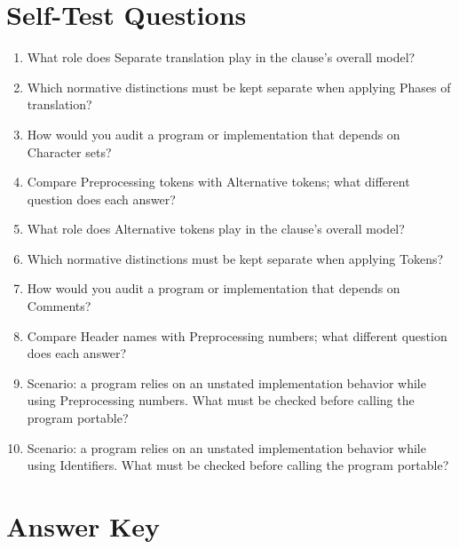 \documentclass[11pt,letterpaper]{article}
\begin{document}
\section{Self-Test Questions}
\begin{enumerate}
\item What role does Separate translation play in the clause's overall model?
\item Which normative distinctions must be kept separate when applying Phases of translation?
\item How would you audit a program or implementation that depends on Character sets?
\item Compare Preprocessing tokens with Alternative tokens; what different question does each answer?
\item What role does Alternative tokens play in the clause's overall model?
\item Which normative distinctions must be kept separate when applying Tokens?
\item How would you audit a program or implementation that depends on Comments?
\item Compare Header names with Preprocessing numbers; what different question does each answer?
\item Scenario: a program relies on an unstated implementation behavior while using Preprocessing numbers. What must be checked before calling the program portable?
\item Scenario: a program relies on an unstated implementation behavior while using Identifiers. What must be checked before calling the program portable?
\end{enumerate}
\clearpage\section{Answer Key}
\end{document}
